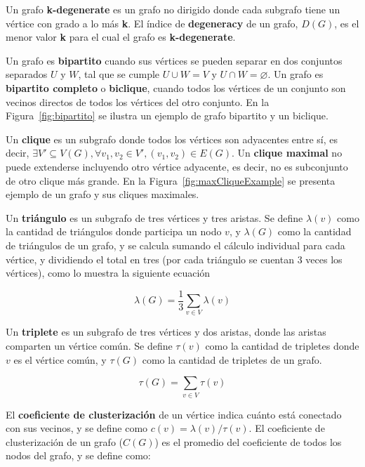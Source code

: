 

Un grafo \textbf{k-degenerate} es un grafo no dirigido donde cada subgrafo tiene un vértice con grado a lo más \textbf{k}. El índice de \textbf{degeneracy} de un grafo, $D(G)$, es el menor valor \textbf{k} para el cual el grafo es \textbf{k-degenerate}.

Un grafo es \textbf{bipartito} cuando sus vértices se pueden separar en dos conjuntos separados $U$ y $W$, tal que se cumple $U \cup W = V$ y $U \cap W = \varnothing$. Un grafo es \textbf{bipartito completo} o \textbf{biclique}, cuando todos los vértices de un conjunto son vecinos directos de todos los vértices del otro conjunto. En la Figura~\ref{fig:bipartito} se ilustra un ejemplo de grafo bipartito y un biclique.


Un \textbf{clique} es un subgrafo donde todos los vértices son adyacentes entre sí, es decir, $\exists V' \subseteq V(G), \forall v_{1}, v_{2} \in V', (v_{1}, v_{2}) \in E(G) $. Un \textbf{clique maximal} no puede extenderse incluyendo otro vértice adyacente, es decir, no es subconjunto de otro clique más grande. En la Figura~\ref{fig:maxCliqueExample} se presenta ejemplo de un grafo y sus cliques maximales.



Un \textbf{triángulo} es un subgrafo de tres vértices y tres aristas. Se define $\lambda(v)$ como la cantidad de triángulos donde participa un nodo $v$, y $\lambda(G)$ como la cantidad de triángulos de un grafo, y se calcula sumando el cálculo individual para cada vértice, y dividiendo el total en tres (por cada triángulo se cuentan 3 veces los vértices), como lo muestra la siguiente ecuación

\begin{equation}
	\lambda(G) = \dfrac{1}{3} \sum_{v \in V} \lambda(v) \label{eq:triangles}
\end{equation}

Un \textbf{triplete} es un subgrafo de tres vértices y dos aristas, donde las aristas comparten un vértice común. Se define $\tau(v)$ como la cantidad de tripletes donde $v$ es el vértice común, y $\tau(G)$ como la cantidad de tripletes de un grafo.

\begin{equation}
	\tau(G) = \sum_{v \in V} \tau(v) \label{eq:triplets}
\end{equation}

El \textbf{coeficiente de clusterización} de un vértice indica cuánto está conectado con sus vecinos, y se define como $c(v) =  \lambda(v) / \tau(v)$. El coeficiente de clusterización de un grafo ($C(G)$) es el promedio del coeficiente de todos los nodos del grafo, y se define como:

